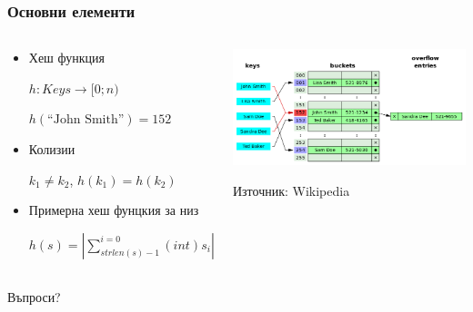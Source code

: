 \documentclass{beamer}
\begin{document}
\begin{frame}[fragile]
\frametitle{Основни елементи}


\begin{columns}[t]
  \begin{column}{0.4\textwidth}

\begin{itemize}
  \item Хеш функция

  $h:Keys \rightarrow [0;n)$

  $h(\text{``John Smith''})=152$

  \item Колизии
  
  $k_1 \neq k_2$, $h(k_1)=h(k_2)$

  \item {Примерна хеш фунцкия за низ}

  $h(s)=|\sum\limits^{i=0}_{strlen(s)-1}(int)s_i|_n$
\end{itemize}

  \end{column}
  \begin{column}{0.6\textwidth}
\begin{center}
\includegraphics[width=7cm]{images/hast1}
  
\end{center}
\begin{center}
Източник: Wikipedia
\end{center}

  \end{column}
\end{columns}
\end{frame}

\begin{frame}
\centerline{Въпроси?}
\end{frame}
\end{document}
